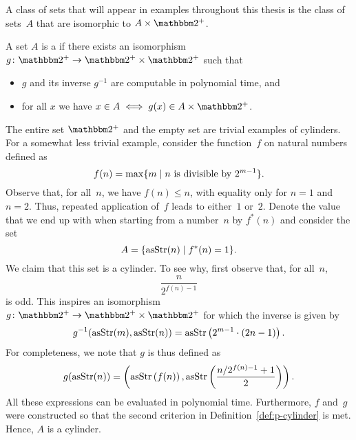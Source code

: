 A class of sets that will appear in examples throughout this thesis is the class of sets~$A$ that are isomorphic to $A \times \binary^+$.
\begin{definition}
\label{def:p-cylinder}%
  A set $A$ is a  if there exists an isomorphism $g\colon \binary^+ \to \binary^+ \times \binary^+$ such that
  \begin{itemize}
    \item $g$ and its inverse $g^{-1}$ are computable in polynomial time, and
    \item for all $x$ we have $x \in A \iff g(x) \in A \times \binary^+$.
  \end{itemize}
\end{definition}

\begin{example}
  The entire set $\binary^+$ and the empty set are trivial examples of \pdash{}cylinders.
  For a somewhat less trivial example, consider the function~$f$ on natural numbers defined as
  \begin{equation*}
    f(n) = \max \{m \;|\; \text{$n$ is divisible by $2^{m-1}$}\}.
  \end{equation*}
  Observe that, for all~$n$, we have $f(n) \le n$, with equality only for $n = 1$ and $n = 2$.
  Thus, repeated application of~$f$ leads to either~$1$ or~$2$.
  Denote the value that we end up with when starting from a number~$n$ by $f^*(n)$ and consider the set
  \begin{equation*}
    A = \{\operatorname{asStr}(n) \;|\; f^*(n) = 1\}.
  \end{equation*}
  We claim that this set is a \pdash{}cylinder.
  To see why, first observe that, for all~$n$,
  \begin{equation*}
    \frac{n}{2^{f(n) - 1}}
  \end{equation*}
  is odd.
  This inspires an isomorphism $g\colon \binary^+ \to \binary^+ \times \binary^+$ for which the inverse is given by
  \begin{equation*}
    g^{-1}(\operatorname{asStr}(m), \operatorname{asStr}(n)) = \operatorname{asStr}\left(2^{m - 1} \cdot (2 n - 1)\right).
  \end{equation*}
  For completeness, we note that $g$ is thus defined as
  \begin{equation*}
    g(\operatorname{asStr}(n)) = \left(\operatorname{asStr}\left(f(n)\right),\operatorname{asStr}\left(\frac{n / 2^{f(n) - 1} + 1}{2}\right)\right).
  \end{equation*}
  All these expressions can be evaluated in polynomial time.
  Furthermore, $f$ and~$g$ were constructed so that the second criterion in Definition~\ref{def:p-cylinder} is met.
  Hence, $A$ is a \pdash{}cylinder.
\end{example}

